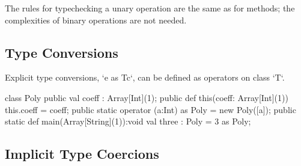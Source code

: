 The rules for typechecking a unary operation are the same as for methods; the
complexities of binary operations are not needed.



\subsection{Type Conversions}

Explicit type conversions, \xcd`e as T{c}`, can be defined as operators on
class \xcd`T`.

\begin{xten}
class Poly {
  public val coeff : Array[Int](1);
  public def this(coeff: Array[Int](1)) { this.coeff = coeff;}
  public static operator (a:Int) as Poly = new Poly([a]);
  public static def main(Array[String](1)):void {
     val three : Poly = 3 as Poly;
  }
}
\end{xten}
%




\subsection{Implicit Type Coercions}

